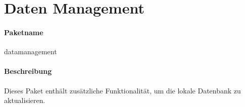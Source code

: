 \section{Daten Management}
\paragraph*{Paketname}
datamanagement
\paragraph*{Beschreibung}
Dieses Paket enthält zusätzliche Funktionalität, um die lokale Datenbank zu aktualisieren.

